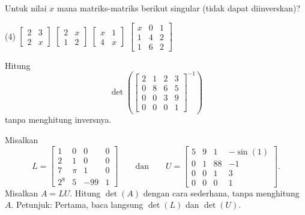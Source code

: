 \begin{exercise}
Untuk nilai $x$ mana matriks-matriks berikut singular (tidak dapat diinverskan)?
\begin{tasks}(4)
\task
$\begin{bmatrix}
2 & 3 \\
2 & x
\end{bmatrix}$
\task
$\begin{bmatrix}
2 & x \\
1 & 2
\end{bmatrix}$
\task
$\begin{bmatrix}
x & 1 \\
4 & x
\end{bmatrix}$
\task
$\begin{bmatrix}
x & 0 & 1 \\
1 & 4 & 2 \\
1 & 6 & 2
\end{bmatrix}$
\end{tasks}
\end{exercise}

\begin{exercise}
Hitung
\begin{equation*}
\det \left( \begin{bmatrix}
2 & 1 & 2 & 3 \\
0 & 8 & 6 & 5 \\
0 & 0 & 3 & 9 \\
0 & 0 & 0 & 1
\end{bmatrix}^{-1}
\right)
\end{equation*}
tanpa menghitung inversnya.
\end{exercise}

\begin{exercise}
Misalkan
\begin{equation*}
L = \begin{bmatrix}
1 & 0 & 0 & 0 \\
2 & 1 & 0 & 0 \\
7 & \pi & 1 & 0 \\
2^8 & 5 & -99 & 1
\end{bmatrix}
\qquad \text{dan} \qquad
U = \begin{bmatrix}
5 & 9 & 1 & -\sin(1) \\
0 & 1 & 88 & -1 \\
0 & 0 & 1 & 3 \\
0 & 0 & 0 & 1
\end{bmatrix} .
\end{equation*}
Misalkan $A = LU$. Hitung $\det(A)$ dengan cara sederhana, tanpa menghitung $A$.
Petunjuk: Pertama, baca langsung $\det(L)$ dan $\det(U)$.
\end{exercise}

